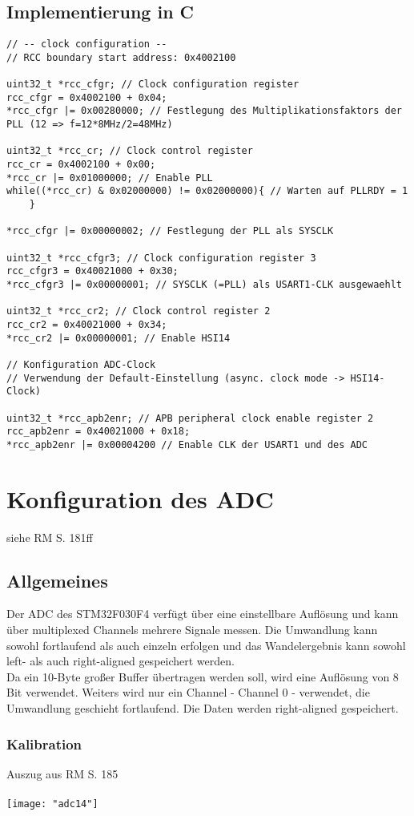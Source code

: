 \documentclass[11pt]{report}
\begin{document}
		\subsection{Implementierung in C}
			\begin{lstlisting}
// -- clock configuration --
// RCC boundary start address: 0x4002100

uint32_t *rcc_cfgr; // Clock configuration register
rcc_cfgr = 0x4002100 + 0x04;
*rcc_cfgr |= 0x00280000; // Festlegung des Multiplikationsfaktors der PLL (12 => f=12*8MHz/2=48MHz)

uint32_t *rcc_cr; // Clock control register
rcc_cr = 0x4002100 + 0x00;
*rcc_cr |= 0x01000000; // Enable PLL
while((*rcc_cr) & 0x02000000) != 0x02000000){ // Warten auf PLLRDY = 1
	}

*rcc_cfgr |= 0x00000002; // Festlegung der PLL als SYSCLK

uint32_t *rcc_cfgr3; // Clock configuration register 3
rcc_cfgr3 = 0x40021000 + 0x30;
*rcc_cfgr3 |= 0x00000001; // SYSCLK (=PLL) als USART1-CLK ausgewaehlt

uint32_t *rcc_cr2; // Clock control register 2
rcc_cr2 = 0x40021000 + 0x34;
*rcc_cr2 |= 0x00000001; // Enable HSI14
	
// Konfiguration ADC-Clock
// Verwendung der Default-Einstellung (async. clock mode -> HSI14-Clock)
	
uint32_t *rcc_apb2enr; // APB peripheral clock enable register 2
rcc_apb2enr = 0x40021000 + 0x18;
*rcc_apb2enr |= 0x00004200 // Enable CLK der USART1 und des ADC
			\end{lstlisting}
	\section{Konfiguration des ADC}
		siehe RM S. 181ff
		\subsection{Allgemeines}
			Der ADC des STM32F030F4 verfügt über eine einstellbare Auflösung und kann über multiplexed Channels mehrere Signale messen. Die Umwandlung kann sowohl fortlaufend als auch einzeln erfolgen und das Wandelergebnis kann sowohl left- als auch right-aligned gespeichert werden.\\
			Da ein 10-Byte großer Buffer übertragen werden soll, wird eine Auflösung von 8 Bit verwendet. Weiters wird nur ein Channel - Channel 0 - verwendet, die Umwandlung geschieht fortlaufend. Die Daten werden right-aligned gespeichert.
			\subsubsection{Kalibration}
				Auszug aus RM S. 185\\
				\\\texttt{[image: "adc14"]}\\
\end{document}

